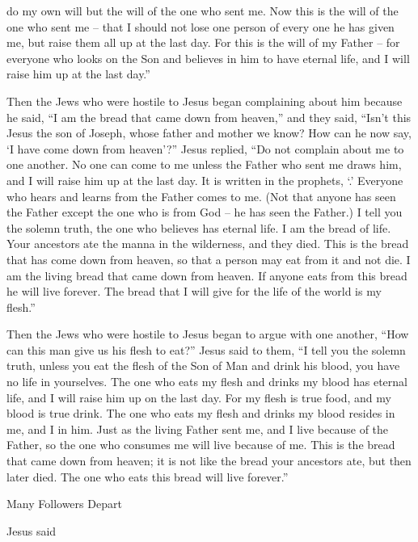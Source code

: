 {do
my own
will
but
the will
of the one who sent
me.
Now
this
is
the will
of the one who sent
me
– that
I should
not
lose
one person of every
one he has given
me,
but
raise
them
all up
at the last
day.
For
this
is
the will
of
my
Father
– for
everyone
who looks
on the Son
and
believes
in
him
to have
eternal
life,
and
I
will raise
him
up
at the last
day.”
\par }{\PP {}Then
the Jews
who were hostile to Jesus began complaining
about
him
because
he said,
“I
am
the bread
that came down
from
heaven,”
and
they said,
“Isn’t
this
Jesus
the son
of Joseph,
whose
father
and
mother
we
know? How
can he
now
say,
‘I have come down
from
heaven’?”
Jesus
replied, “Do
not
complain
about me to
one another.
No one
can
come
to
me
unless
the Father
who sent
me
draws
him,
and I
will raise
him
up
at
the last
day.
It is
written
in
the prophets, ‘{}.’ Everyone
who hears
and
learns
from
the Father
comes
to
me.
(Not
that
anyone
has seen
the Father
except
the one who is
from
God
– he
has seen
the Father.)
I tell
you
the solemn truth,
the one who believes
has
eternal
life.
I
am
the bread
of life.
Your
ancestors
ate
the manna
in
the wilderness,
and
they died.
This
is
the bread
that has come down
from
heaven,
so that
a person
may eat
from
it
and
not
die.
I
am
the living
bread
that came down
from
heaven.
If
anyone
eats
from
this
bread
he will live
forever.
The bread
that
I
will give
for
the life
of the world
is
my
flesh.”
\par }{\PP {}Then
the Jews
who were hostile to Jesus began to argue
with
one another, “How
can
this man
give
us
his
flesh
to eat?”
Jesus
said
to them,
“I tell
you
the solemn truth,
unless
you eat
the flesh
of the Son
of Man
and
drink
his
blood,
you have
no
life
in
yourselves.
The one who eats
my
flesh
and
drinks
my
blood
has
eternal
life,
and I
will raise
him
up
on the last
day.
For
my
flesh
is
true
food,
and
my
blood
is
true
drink.
The one who eats
my
flesh
and
drinks
my
blood
resides
in
me,
and I
in
him.
Just as
the living
Father
sent
me,
and I
live
because
of the Father,
so
the one
who consumes
me
will live
because of
me.
This
is
the bread
that came down
from
heaven;
it is not
like
the bread your ancestors
ate,
but
then later died.
The one who eats
this
bread
will live
forever.”
\par }{\SH Many Followers Depart
\par }{\PP {}Jesus said
}
